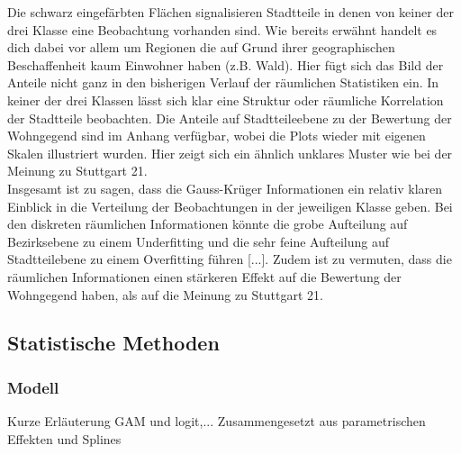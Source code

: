 \documentclass{Vorlage}
\begin{document}
Die schwarz eingefärbten Flächen signalisieren Stadtteile in denen von keiner der drei Klasse eine Beobachtung vorhanden sind. Wie bereits erwähnt handelt es dich dabei vor allem um Regionen die auf Grund ihrer geographischen Beschaffenheit kaum Einwohner haben (z.B. Wald). Hier fügt sich das Bild der Anteile nicht ganz in den bisherigen Verlauf der räumlichen Statistiken ein. In keiner der drei Klassen lässt sich klar eine Struktur oder räumliche Korrelation der Stadtteile beobachten. Die Anteile auf Stadtteileebene zu der Bewertung der Wohngegend sind im Anhang verfügbar, wobei die Plots wieder mit eigenen Skalen illustriert wurden. Hier zeigt sich ein ähnlich unklares Muster wie bei der Meinung zu Stuttgart 21.\\
Insgesamt ist zu sagen, dass die Gauss-Krüger Informationen ein relativ klaren Einblick in die Verteilung der Beobachtungen in der jeweiligen Klasse geben. Bei den diskreten räumlichen Informationen könnte die grobe Aufteilung auf Bezirksebene zu einem Underfitting und die sehr feine Aufteilung auf Stadtteilebene zu einem Overfitting führen [...]. Zudem ist zu vermuten, dass die räumlichen Informationen einen stärkeren Effekt auf die Bewertung der Wohngegend haben, als auf die Meinung zu Stuttgart 21.

\subsection{Statistische Methoden}

\subsubsection{Modell}
Kurze Erläuterung GAM und logit,... Zusammengesetzt aus parametrischen Effekten und Splines
\end{document}
